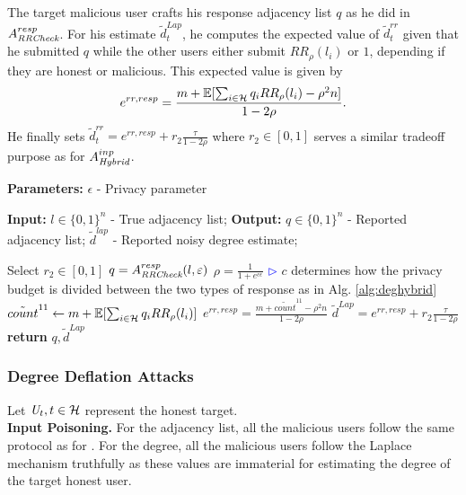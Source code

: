 The target malicious user crafts his response adjacency list $q$ as he did in $A_{\textit{RRCheck}}^{resp}$. For his estimate $\tilde{d}_t^{Lap}$, he computes the expected value of $\tilde{d}_t^{rr}$ given that he submitted $q$ while the other users either submit $RR_\rho(l_i)$ or $1$, depending if they are honest or malicious. This expected value is given by
\[
e^{rr, resp} = \frac{m + \operatorname{\mathbb{E}}[\sum_{i \in \mathcal{H}} q_i RR_\rho(l_i) - \rho^2 n]}{1-2\rho}.
\]
He finally sets $\tilde{d}_t^{rr} = e^{rr,resp} + r_2 \frac{\tau}{1-2\rho}$ where $r_2 \in [0,1]$ serves a similar tradeoff purpose as for $A_{\textit{Hybrid}}^{inp}$. 

\begin{algorithm}[bt]
  \caption{$A_{\DegHybrid}^{resp}: \{0,1\}^n\mapsto\{0,1\}^n$ }
  \begin{algorithmic}[1]
  \Statex \textbf{Parameters:} $\epsilon$ - Privacy parameter
  
  \Statex\textbf{Input:} $l \in \{0,1\}^n$ - True adjacency list;
  \Statex \textbf{Output:} $q \in \{0,1\}^n$ - Reported adjacency list;
   \Statex \hspace{1.1cm} $\tilde{d}^{lap}$ - Reported noisy degree estimate;
  \vspace{0.2cm}
  
  \State Select $r_2\in [0,1]$ 
\State $q=A_{\textit{RRCheck}}^{resp}(l, \varepsilon)$
\State $\rho=\frac{1}{1+e^{c\epsilon}}$
\Statex \hfill\textcolor{blue}{$\rhd$} $c$ determines how the privacy budget is divided between the two types of response as in Alg. \ref{alg:deghybrid}
\State $\tilde{count}^{11} \gets m + \operatorname{\mathbb{E}}[\sum_{i \in \mathcal{H}} q_i RR_\rho(l_i)]$
\State $e^{rr,resp} = \frac{m + \tilde{count}^{11} - \rho^2 n}{1-2\rho}$
\State $\tilde{d}^{Lap} = e^{rr,resp} + r_2 \frac{\tau}{1-2\rho}$
\Statex \textbf{return} $q,\tilde{d}^{Lap}$
  \end{algorithmic}
\end{algorithm}


\subsubsection{Degree Deflation Attacks}
Let $\textit{U}_t, t \in \mathcal{H}$ represent the honest target.\\
\noindent\textbf{Input Poisoning.}
For the adjacency list, all the malicious users follow the same protocol as for \DegRRCheck{}. For the degree, all the malicious users follow the Laplace mechanism truthfully as these values are immaterial for estimating the degree of the target honest user.
  
